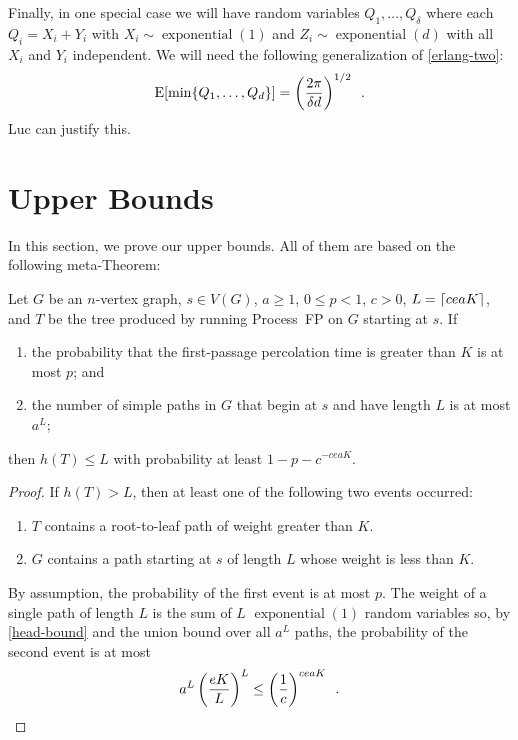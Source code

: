 \documentclass[lotsofwhite]{patmorin}
\DeclareMathOperator{\exponential}{exponential}
\begin{document}
Finally, in one special case we will have random variables
$Q_1,\ldots,Q_\delta$ where each $Q_i=X_i+Y_i$ with $X_i\sim\exponential(1)$
and $Z_i\sim\exponential(d)$ with all $X_i$ and $Y_i$ independent.  We will need the following generalization of
\eqref{erlang-two}:
\begin{equation}
   \E[\min\{Q_1,\ldots,Q_d\}] = \left(\frac{2\pi}{\delta d}\right)^{1/2}
     \enspace .
     \eqlabel{weird-one}
\end{equation}
Luc can justify this.



\section{Upper Bounds}

In this section, we prove our upper bounds. All of them are based on
the following meta-Theorem:

\begin{lem}
   Let $G$ be an $n$-vertex graph, $s\in V(G)$, $a\ge 1$, $0\le p<1$, $c>0$, 
   $L={\lceil ceaK \rceil}$, and $T$ be the tree produced by running Process~FP
   on $G$ starting at $s$.  If 
   \begin{enumerate}
      \item the probability that the first-passage percolation time is greater than $K$ is at most $p$; and

      \item the number of simple paths in $G$ that begin at $s$ and have
        length $L$ is at most $a^L$;
   \end{enumerate}
   then $h(T) \le L$ with probability at least $1-p-c^{-ceaK}$.
\end{lem}

\begin{proof}
   If $h(T)> L$, then at least one of the following two events occurred:
   \begin{enumerate}
     \item $T$ contains a root-to-leaf path of weight greater than $K$.
     \item $G$ contains a path starting at $s$ of length $L$ whose weight 
        is less than $K$.
   \end{enumerate}
   By assumption, the probability of the first event is at most $p$.  
   The weight of a single path of length $L$ is the sum of $L$ $\exponential(1)$
   random variables so, by \eqref{head-bound} and the union bound over
   all $a^L$ paths, the probability of the second event is at most
   \[
       a^L \left(\frac{eK}{L} \right)^L \le \left(\frac{1}{c}\right)^{ceaK}
       \enspace . \qedhere
   \]
\end{proof}
\end{document}
